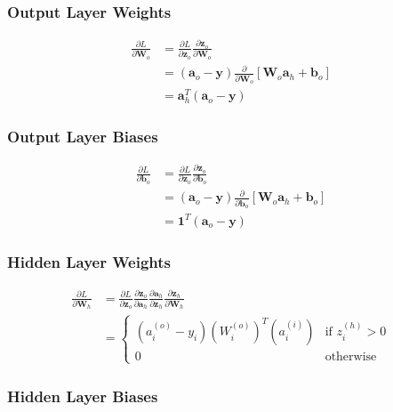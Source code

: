 \documentclass[letter]{article}
\begin{document}
\subsubsection{Output Layer Weights}

\begin{align*}
\frac{\partial{L}}{\partial{\textbf{W}_o}} &= \frac{\partial{L}}{\partial{\textbf{z}_o}} \frac{\partial{\textbf{z}_o}}{\partial{\textbf{W}_o}} \\
&= \left( \textbf{a}_o - \textbf{y} \right) \frac{\partial{}}{\partial{\textbf{W}_o}} \left[ \textbf{W}_o \textbf{a}_h + \textbf{b}_o \right] \\
&= \textbf{a}_h^T \left( \textbf{a}_o - \textbf{y} \right)
\end{align*}

\subsubsection{Output Layer Biases}

\begin{align*}
\frac{\partial{L}}{\partial{\textbf{b}_o}} &= \frac{\partial{L}}{\partial{\textbf{z}_o}} \frac{\partial{\textbf{z}_o}}{\partial{\textbf{b}_o}} \\
&= \left( \textbf{a}_o - \textbf{y} \right) \frac{\partial{}}{\partial{\textbf{b}_o}} \left[ \textbf{W}_o \textbf{a}_h + \textbf{b}_o \right] \\
&= \textbf{1}^T \left( \textbf{a}_o - \textbf{y} \right)
\end{align*}

\subsubsection{Hidden Layer Weights}

\begin{align*}
\frac{\partial{L}}{\partial{\textbf{W}_h}} &= \frac{\partial{L}}{\partial{\textbf{z}_o}} \frac{\partial{\textbf{z}_o}}{\partial{\textbf{a}_h}} \frac{\partial{\textbf{a}_h}}{\partial{\textbf{z}_h}}
\frac{\partial{\textbf{z}_h}}{\partial{\textbf{W}_h}} \\
&= 
\begin{cases}
	\left( a_i^{(o)} - y_i \right) \left(W_i^{(o)}\right)^T \left(a_i^{(i)}\right) & \text{if } z_i^{(h)} > 0 \\
	0 & \text{otherwise}
\end{cases}
\end{align*}

\subsubsection{Hidden Layer Biases}
\end{document}
